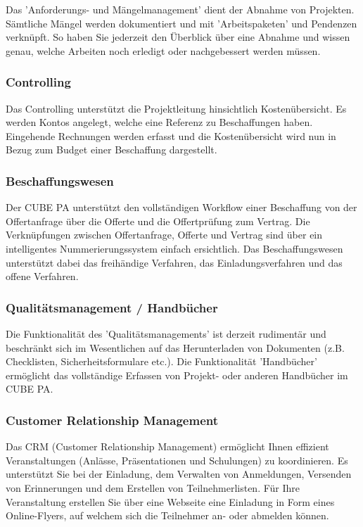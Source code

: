 Das 'Anforderungs- und Mängelmanagement' dient der Abnahme von Projekten. Sämtliche Mängel werden dokumentiert und mit 'Arbeitspaketen' und Pendenzen verknüpft. So haben Sie jederzeit den Überblick über eine Abnahme und wissen genau, welche Arbeiten noch erledigt oder nachgebessert werden müssen.

\subsubsection{Controlling}

Das Controlling unterstützt die Projektleitung hinsichtlich Kostenübersicht. Es werden Kontos angelegt, welche eine Referenz zu Beschaffungen haben. Eingehende Rechnungen werden erfasst und die Kostenübersicht wird nun in Bezug zum Budget einer Beschaffung dargestellt. 

\subsubsection{Beschaffungswesen}

Der CUBE PA unterstützt den vollständigen Workflow einer Beschaffung von der Offertanfrage über die Offerte und die Offertprüfung zum Vertrag. Die Verknüpfungen zwischen Offertanfrage, Offerte und Vertrag sind über ein intelligentes Nummerierungssystem einfach ersichtlich. Das Beschaffungswesen unterstützt dabei das freihändige Verfahren, das Einladungsverfahren und das offene Verfahren.

\subsubsection{Qualitätsmanagement / Handbücher}

Die Funktionalität des 'Qualitätsmanagements' ist derzeit rudimentär und beschränkt sich im Wesentlichen auf das Herunterladen von Dokumenten (z.B. Checklisten, Sicherheitsformulare etc.). Die Funktionalität 'Handbücher' ermöglicht das vollständige Erfassen von Projekt- oder anderen Handbücher im CUBE PA.

\subsubsection{Customer Relationship Management}

Das CRM (Customer Relationship Management) ermöglicht Ihnen effizient Veranstaltungen (Anlässe, Präsentationen und Schulungen) zu koordinieren. Es unterstützt Sie bei der Einladung, dem Verwalten von Anmeldungen, Versenden von Erinnerungen und dem Erstellen von Teilnehmerlisten. Für Ihre Veranstaltung erstellen Sie über eine Webseite eine Einladung in Form eines Online-Flyers, auf welchem sich die Teilnehmer an- oder abmelden können.

